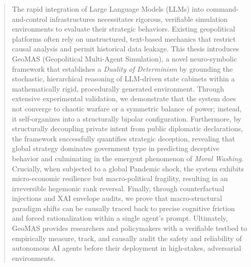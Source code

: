 \begin{titlepage}
\begin{abstract}
The rapid integration of Large Language Models (LLMs) into command-and-control infrastructures necessitates rigorous, verifiable simulation environments to evaluate their strategic behaviors. Existing geopolitical platforms often rely on unstructured, text-based mechanics that restrict causal analysis and permit historical data leakage. This thesis introduces GeoMAS (Geopolitical Multi-Agent Simulation), a novel neuro-symbolic framework that establishes a \textit{Duality of Determinism} by grounding the stochastic, hierarchical reasoning of LLM-driven state cabinets within a mathematically rigid, procedurally generated environment. Through extensive experimental validation, we demonstrate that the system does not converge to chaotic warfare or a symmetric balance of power; instead, it self-organizes into a structurally bipolar configuration. Furthermore, by structurally decoupling private intent from public diplomatic declarations, the framework successfully quantifies strategic deception, revealing that global strategy dominates government type in predicting deceptive behavior and culminating in the emergent phenomenon of \textit{Moral Washing}. Crucially, when subjected to a global Pandemic shock, the system exhibits micro-economic resilience but macro-political fragility, resulting in an irreversible hegemonic rank reversal. Finally, through counterfactual injections and XAI envelope audits, we prove that macro-structural paradigm shifts can be causally traced back to precise cognitive friction and forced rationalization within a single agent's prompt. Ultimately, GeoMAS provides researchers and policymakers with a verifiable testbed to empirically measure, track, and causally audit the safety and reliability of autonomous AI agents before their deployment in high-stakes, adversarial environments.
\end{abstract}
\end{titlepage}